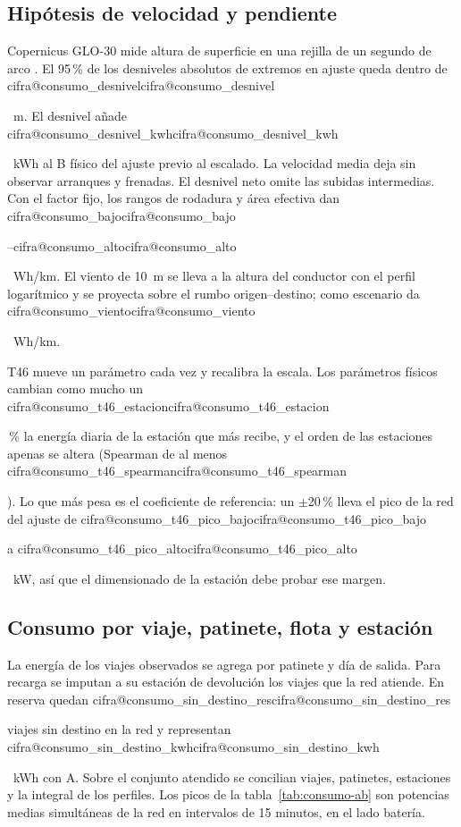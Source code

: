 \documentclass[11pt,a4paper]{article}
\makeatletter
\newcommand\cifra[1]{\ifcsname cifra@#1\endcsname\csname cifra@#1\endcsname
  \else\PackageError{memoria}{Cifra desconocida: \detokenize{#1}}{Revisa generar_cifras.py}\fi}
\newcommand\pc{\,\%}
\makeatother
\begin{document}
\subsection{Hipótesis de velocidad y pendiente}
Copernicus GLO-30 mide altura de superficie en una rejilla de un segundo
de arco \cite{copernicus_dem}. El 95\pc{} de los desniveles absolutos de
extremos en ajuste queda dentro de \cifra{consumo_desnivel}~m. El desnivel
añade \cifra{consumo_desnivel_kwh}~kWh al B físico del ajuste previo al
escalado. La velocidad media deja sin observar arranques y frenadas.
El desnivel neto omite las subidas intermedias.
Con el factor fijo, los rangos de rodadura y área efectiva dan
\cifra{consumo_bajo}--\cifra{consumo_alto}~Wh/km. El viento de 10~m se
lleva a la altura del conductor con el perfil logarítmico y se proyecta sobre
el rumbo origen--destino; como escenario da \cifra{consumo_viento}~Wh/km.

T46 mueve un parámetro cada vez y recalibra la escala. Los parámetros
físicos cambian como mucho un \cifra{consumo_t46_estacion}\pc{} la energía
diaria de la estación que más recibe, y el orden de las estaciones apenas se
altera (Spearman de al menos \cifra{consumo_t46_spearman}). Lo que más pesa es
el coeficiente de referencia: un $\pm$20\pc{} lleva el pico de la red del
ajuste de \cifra{consumo_t46_pico_bajo} a \cifra{consumo_t46_pico_alto}~kW,
así que el dimensionado de la estación debe probar ese margen.

\subsection{Consumo por viaje, patinete, flota y estación}
La energía de los viajes observados se agrega por patinete y día de salida.
Para recarga se imputan a su estación de devolución los viajes que la red
atiende. En reserva quedan \cifra{consumo_sin_destino_res} viajes sin
destino en la red y representan \cifra{consumo_sin_destino_kwh}~kWh con A.
Sobre el conjunto atendido se concilian viajes, patinetes, estaciones y la
integral de los perfiles. Los picos de la tabla~\ref{tab:consumo-ab} son
potencias medias simultáneas de la red en intervalos de 15 minutos, en el
lado batería.
\end{document}

